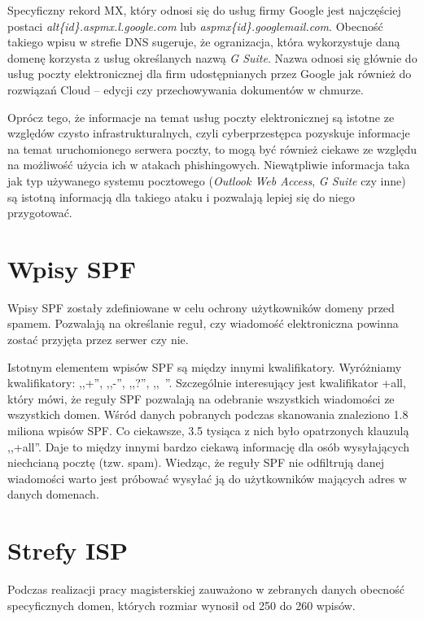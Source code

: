 Specyficzny rekord MX, który odnosi się do usług firmy Google jest najczęściej postaci \textit{alt\{id\}.aspmx.l.google.com} lub
\textit{aspmx\{id\}.googlemail.com}. Obecność takiego wpisu w strefie DNS sugeruje, że ogranizacja, która wykorzystuje daną domenę
korzysta z usług określanych nazwą \textit{G Suite}. Nazwa odnosi się głównie do usług poczty elektronicznej dla firm udostępnianych
przez Google jak również do rozwiązań Cloud -- edycji czy przechowywania dokumentów w chmurze.

Oprócz tego, że informacje na temat usług poczty elektronicznej są istotne ze względów czysto infrastrukturalnych, czyli cyberprzestępca
pozyskuje informacje na temat uruchomionego serwera poczty, to mogą być również ciekawe ze względu na możliwość użycia ich w atakach
phishingowych. Niewątpliwie informacja taka jak typ używanego systemu pocztowego (\textit{Outlook Web Access}, \textit{G Suite} czy
inne) są istotną informacją dla takiego ataku i pozwalają lepiej się do niego przygotować.


\section{Wpisy SPF}
Wpisy SPF zostały zdefiniowane w celu ochrony użytkowników domeny przed spamem. Pozwalają na określanie reguł, czy wiadomość
elektroniczna powinna zostać przyjęta przez serwer czy nie.

Istotnym elementem wpisów SPF są między innymi kwalifikatory. Wyróżniamy kwalifikatory: ,,+'', ,,-'', ,,?'', ,,~''. Szczególnie
interesujący jest kwalifikator +all, który mówi, że reguły SPF pozwalają na odebranie wszystkich wiadomości ze wszystkich domen.
Wśród danych pobranych podczas skanowania znaleziono 1.8 miliona wpisów SPF. Co ciekawsze, 3.5 tysiąca z nich było opatrzonych
klauzulą ,,+all''. Daje to między innymi bardzo ciekawą informację dla osób wysyłających niechcianą pocztę (tzw. spam). Wiedząc,
że reguły SPF nie odfiltrują danej wiadomości warto jest próbować wysyłać ją do użytkowników mających adres w danych domenach.

\section{Strefy ISP}
Podczas realizacji pracy magisterskiej zauważono w zebranych danych obecność specyficznych domen, których rozmiar wynosił od
250 do 260 wpisów.
